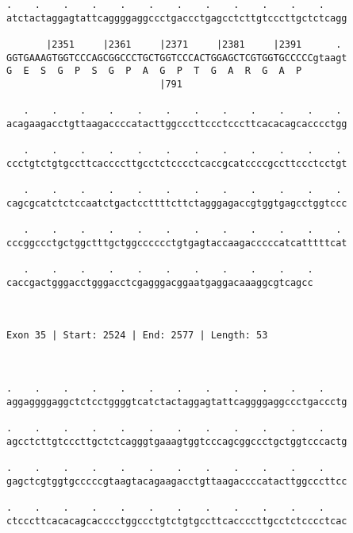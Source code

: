 \documentclass{article}
\begin{document}
\begin{Verbatim}
.    .    .    .    .    .    .    .    .    .    .    .    
atctactaggagtattcaggggaggccctgaccctgagcctcttgtcccttgctctcagg
                                                            
       |2351     |2361     |2371     |2381     |2391      . 
GGTGAAAGTGGTCCCAGCGGCCCTGCTGGTCCCACTGGAGCTCGTGGTGCCCCCgtaagt
G  E  S  G  P  S  G  P  A  G  P  T  G  A  R  G  A  P        
                           |791                             
  
   .    .    .    .    .    .    .    .    .    .    .    . 
acagaagacctgttaagaccccatacttggcccttccctcccttcacacagcacccctgg
                                                            
   .    .    .    .    .    .    .    .    .    .    .    . 
ccctgtctgtgccttcaccccttgcctctcccctcaccgcatccccgccttccctcctgt
                                                            
   .    .    .    .    .    .    .    .    .    .    .    . 
cagcgcatctctccaatctgactccttttcttctagggagaccgtggtgagcctggtccc
                                                            
   .    .    .    .    .    .    .    .    .    .    .    . 
cccggccctgctggctttgctggcccccctgtgagtaccaagacccccatcatttttcat
                                                            
   .    .    .    .    .    .    .    .    .    .    .
caccgactgggacctgggacctcgagggacggaatgaggacaaaggcgtcagcc
                                                      
                                                      
 
Exon 35 | Start: 2524 | End: 2577 | Length: 53



.    .    .    .    .    .    .    .    .    .    .    .    
aggaggggaggctctcctggggtcatctactaggagtattcaggggaggccctgaccctg
                                                            
.    .    .    .    .    .    .    .    .    .    .    .    
agcctcttgtcccttgctctcagggtgaaagtggtcccagcggccctgctggtcccactg
                                                            
.    .    .    .    .    .    .    .    .    .    .    .    
gagctcgtggtgcccccgtaagtacagaagacctgttaagaccccatacttggcccttcc
                                                            
.    .    .    .    .    .    .    .    .    .    .    .    
ctcccttcacacagcacccctggccctgtctgtgccttcaccccttgcctctcccctcac
                                                            

\end{Verbatim}
\end{document}
